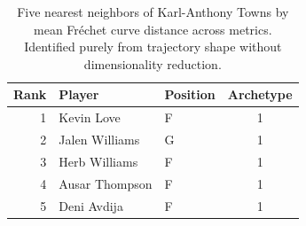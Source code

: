 \begin{table}[htbp]
  \centering\small
  \begin{tabular}{rllc}
    \toprule
    Rank & Player & Position & Archetype \\
    \midrule
    1 & Kevin Love & F & 1 \\
    2 & Jalen Williams & G & 1 \\
    3 & Herb Williams & F & 1 \\
    4 & Ausar Thompson & F & 1 \\
    5 & Deni Avdija & F & 1 \\
    \bottomrule
  \end{tabular}
  \caption{Five nearest neighbors of Karl-Anthony Towns by mean Fr\'{e}chet curve distance across metrics. Identified purely from trajectory shape without dimensionality reduction.}
  \label{tab:Karl_Anthony_Towns_frechet_curve_neighbors}
\end{table}

